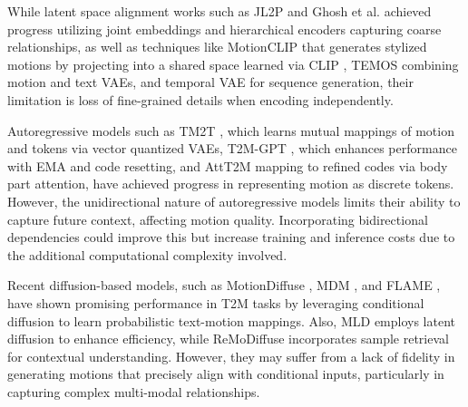 While latent space alignment works such as JL2P \citep{ahuja2019language2pose} and Ghosh et al. \citep{ghosh2021synthesis} achieved progress utilizing joint embeddings and hierarchical encoders capturing coarse relationships, as well as techniques like MotionCLIP \citep{tevet2022motionclip} that generates stylized motions by projecting into a shared space learned via CLIP \citep{radford2021learning}, TEMOS \citep{petrovich2022temos} combining motion and text VAEs, and temporal VAE \citep{guo2022generating} for sequence generation, their limitation is loss of fine-grained details when encoding independently. 

Autoregressive models such as TM2T \citep{guo2022tm2t}, which learns mutual mappings of motion and tokens via vector quantized VAEs, T2M-GPT \citep{zhang2023generating}, which enhances performance with EMA and code resetting, and AttT2M \citep{zhong2023attt2m} mapping to refined codes via body part attention, have achieved progress in representing motion as discrete tokens. However, the unidirectional nature of autoregressive models limits their ability to capture future context, affecting motion quality. Incorporating bidirectional dependencies could improve this but increase training and inference costs due to the additional computational complexity involved.

Recent diffusion-based models, such as MotionDiffuse \citep{zhang2022motiondiffuse}, MDM \citep{tevet2023human}, and FLAME \citep{kim2023flame}, have shown promising performance in T2M tasks by leveraging conditional diffusion to learn probabilistic text-motion mappings. Also, MLD \citep{chen2023executing} employs latent diffusion to enhance efficiency, while ReMoDiffuse \citep{zhang2023remodiffuse} incorporates sample retrieval for contextual understanding. However, they may suffer from a lack of fidelity in generating motions that precisely align with conditional inputs, particularly in capturing complex multi-modal relationships. 



